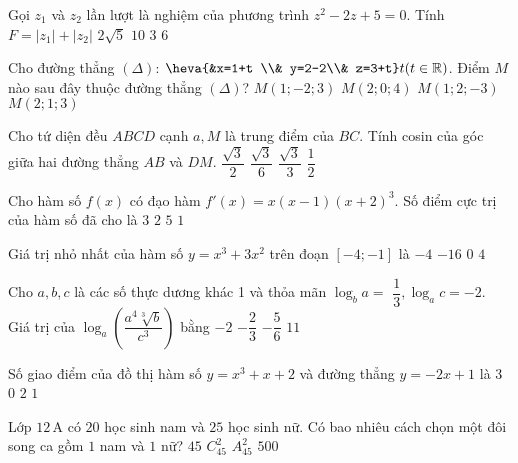 \begin{ex}%
Gọi $z_1$ và $z_2$ lần lượt là nghiệm của phương trình $z^2-2 z+5=0$. Tính $F=\left|z_1\right|+\left|z_2\right|$ 
\choice
{\True $2\sqrt{5}$}
{$10$}
{$3$}
{$6$}

\end{ex}
\begin{ex}%
Cho đường thẳng $(\Delta)$: $\heva{&x=1+t \\& y=2-2\\& z=3+t} t(t \in \mathbb{R})$. Điểm $M$ nào sau đây thuộc đường thẳng $(\Delta)$?
\choice
{$M(1;-2; 3)$}
{\True $M(2; 0; 4)$}
{$M(1; 2;-3)$}
{$M(2; 1; 3)$}

\end{ex}
\begin{ex}%
Cho tứ diện đều $ABCD$ cạnh $a, M$ là trung điểm của $BC$. Tính cosin của góc giữa hai đường thẳng $AB$ và $DM$.
\choice
{$\dfrac{\sqrt{3}}{2}$}
{\True $\dfrac{\sqrt{3}}{6}$}
{$\dfrac{\sqrt{3}}{3}$}
{$\dfrac{1}{2}$}

\end{ex}
\begin{ex}%
Cho hàm số $f(x)$ có đạo hàm $f'(x)=x(x-1)(x+2)^3$. Số điểm cực trị của hàm số đã cho là
\choice
{\True $3$}
{$2$}
{$5$}
{$1$}

\end{ex}
\begin{ex}%
Giá trị nhỏ nhất của hàm số $y=x^3+3 x^2$ trên đoạn $[-4;-1]$ là
\choice
{$-4$}
{\True $-16$}
{$0$}
{$4$}

\end{ex}
\begin{ex}%
Cho $a, b, c$ là các số thực dương khác 1 và thỏa mãn $\log_b a=$ $\dfrac{1}{3}, \log_a c=-2$. Giá trị của $\log_a\left(\dfrac{a^4 \sqrt[3]{b}}{c^3}\right)$ bằng
\choice
{$-2$}
{$-\dfrac{2}{3}$}
{$-\dfrac{5}{6}$}
{\True $11$}

\end{ex}
\begin{ex}%
Số giao điểm của đồ thị hàm số $y=x^3+x+2$ và đường thẳng $y=-2 x+1$ là
\choice
{$3$}
{$0$}
{$2$}
{\True $1$}

\end{ex}
\begin{ex}%
Lớp $12\mathrm{\,A}$ có $20$ học sinh nam và $25$ học sinh nữ. Có bao nhiêu cách chọn một đôi song ca gồm $1$ nam và $1$ nữ?
\choice
{$45$}
{$C_{45}^2$}
{$A_{45}^2$}
{\True $500$}

\end{ex}

